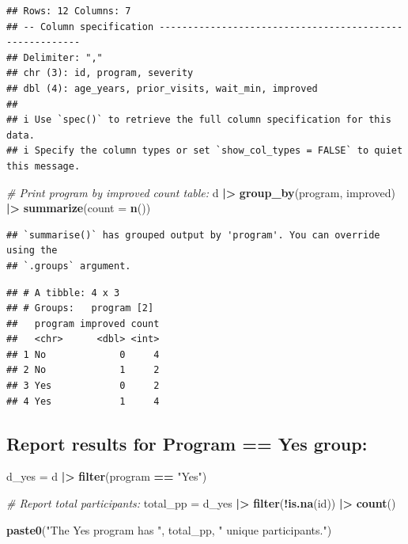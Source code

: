 \documentclass[
]{article}
\newenvironment{Shaded}{\begin{snugshade}}{\end{snugshade}}
\newcommand{\AttributeTok}[1]{\textcolor[rgb]{0.13,0.29,0.53}{#1}}
\newcommand{\CommentTok}[1]{\textcolor[rgb]{0.56,0.35,0.01}{\textit{#1}}}
\newcommand{\FunctionTok}[1]{\textcolor[rgb]{0.13,0.29,0.53}{\textbf{#1}}}
\newcommand{\NormalTok}[1]{#1}
\newcommand{\OtherTok}[1]{\textcolor[rgb]{0.56,0.35,0.01}{#1}}
\newcommand{\SpecialCharTok}[1]{\textcolor[rgb]{0.81,0.36,0.00}{\textbf{#1}}}
\newcommand{\StringTok}[1]{\textcolor[rgb]{0.31,0.60,0.02}{#1}}
\begin{document}
\begin{verbatim}
## Rows: 12 Columns: 7
## -- Column specification --------------------------------------------------------
## Delimiter: ","
## chr (3): id, program, severity
## dbl (4): age_years, prior_visits, wait_min, improved
## 
## i Use `spec()` to retrieve the full column specification for this data.
## i Specify the column types or set `show_col_types = FALSE` to quiet this message.
\end{verbatim}

\begin{Shaded}
\begin{Highlighting}[]
\CommentTok{\# Print program by improved count table:}
\NormalTok{d }\SpecialCharTok{|\textgreater{}} 
  \FunctionTok{group\_by}\NormalTok{(program, improved) }\SpecialCharTok{|\textgreater{}} 
  \FunctionTok{summarize}\NormalTok{(}\AttributeTok{count =} \FunctionTok{n}\NormalTok{())}
\end{Highlighting}
\end{Shaded}

\begin{verbatim}
## `summarise()` has grouped output by 'program'. You can override using the
## `.groups` argument.
\end{verbatim}

\begin{verbatim}
## # A tibble: 4 x 3
## # Groups:   program [2]
##   program improved count
##   <chr>      <dbl> <int>
## 1 No             0     4
## 2 No             1     2
## 3 Yes            0     2
## 4 Yes            1     4
\end{verbatim}

\subsection{Report results for Program == Yes
group:}\label{report-results-for-program-yes-group}

\begin{Shaded}
\begin{Highlighting}[]
\NormalTok{d\_yes }\OtherTok{=}\NormalTok{ d }\SpecialCharTok{|\textgreater{}} 
  \FunctionTok{filter}\NormalTok{(program }\SpecialCharTok{==} \StringTok{"Yes"}\NormalTok{)}

\CommentTok{\# Report total participants:}
\NormalTok{total\_pp }\OtherTok{=}\NormalTok{ d\_yes }\SpecialCharTok{|\textgreater{}} 
  \FunctionTok{filter}\NormalTok{(}\SpecialCharTok{!}\FunctionTok{is.na}\NormalTok{(id)) }\SpecialCharTok{|\textgreater{}} 
  \FunctionTok{count}\NormalTok{()}

\FunctionTok{paste0}\NormalTok{(}\StringTok{"The Yes program has "}\NormalTok{, total\_pp, }\StringTok{" unique participants."}\NormalTok{)}
\end{Highlighting}
\end{Shaded}
\end{document}
